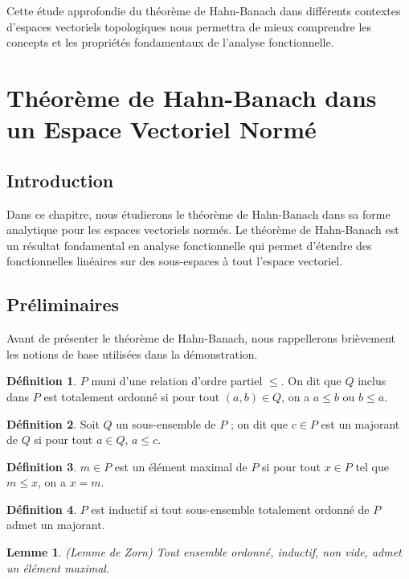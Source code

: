 \documentclass{article}
\theoremstyle{definition}
\newtheorem{definition}{Définition}[section]
\theoremstyle{plain}
\newtheorem{lemma}{Lemme}[section]
\begin{document}
Cette étude approfondie du théorème de Hahn-Banach dans différents contextes d'espaces vectoriels topologiques nous permettra de mieux comprendre les concepts et les propriétés fondamentaux de l'analyse fonctionnelle.

\section{Théorème de Hahn-Banach dans un Espace Vectoriel Normé}
\subsection{Introduction}
Dans ce chapitre, nous étudierons le théorème de Hahn-Banach dans sa forme analytique pour les espaces vectoriels normés. Le théorème de Hahn-Banach est un résultat fondamental en analyse fonctionnelle qui permet d'étendre des fonctionnelles linéaires sur des sous-espaces à tout l'espace vectoriel.

\subsection{Préliminaires}
Avant de présenter le théorème de Hahn-Banach, nous rappellerons brièvement les notions de base utilisées dans la démonstration.

\begin{definition}
    $P$ muni d'une relation d'ordre partiel $\leq$. On dit que $Q$ inclus dans $P$ est totalement ordonné si pour tout $(a, b) \in Q$, on a $a \leq b$ ou $b \leq a$.
\end{definition}

\begin{definition}
    Soit $Q$ un sous-ensemble de $P$ ; on dit que $c \in P$ est un majorant de $Q$ si pour tout $a \in Q$, $a \leq c$.
\end{definition}


\begin{definition}
    $m \in P$ est un élément maximal de $P$ si pour tout $x \in P$ tel que $m \leq x$, on a $x = m$.
\end{definition}


\begin{definition}
    $P$ est inductif si tout sous-ensemble totalement ordonné de $P$ admet un majorant.
\end{definition}

\begin{lemma}
    (Lemme de Zorn) Tout ensemble ordonné, inductif, non vide, admet un élément maximal.
\end{lemma}
\end{document}

